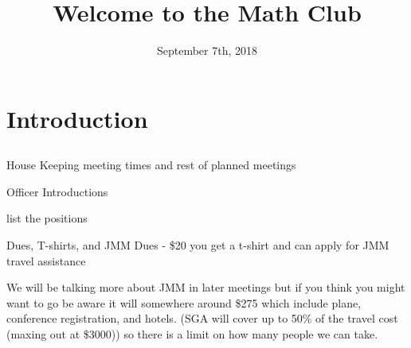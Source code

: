 \documentclass[xcolor=dvipsnames]{beamer}
\title[UCF Math Club Meeting 1]{Welcome to the Math Club}
\author{}
\institute{University of Central Florida}
\date{\scriptsize{September 7th, 2018}}
\begin{document}
\begin{frame}
  \titlepage
  \vfill
\end{frame}

\section{Introduction}
\subsection{}
\begin{frame}{House Keeping}
meeting times and rest of planned meetings 
\end{frame}

\begin{frame}{Officer Introductions}

list the positions 

\end{frame}

\begin{frame}{Dues, T-shirts, and JMM}
Dues - \$20
you get a t-shirt and can apply for JMM travel assistance\newline


\vspace{2cm}
We will be talking more about JMM in later meetings but if you think you might want to go be aware it will somewhere around \$275 which include plane, conference registration, and hotels. (SGA will cover up to 50\% of the travel cost (maxing out at \$3000)) so there is a limit on how many people we can take. 

\end{frame}
\end{document}
